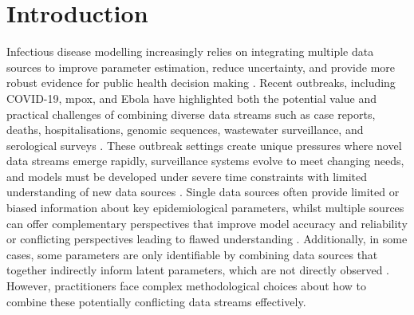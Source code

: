 \documentclass{article}
\begin{document}
\section{Introduction}

Infectious disease modelling increasingly relies on integrating multiple data sources to improve parameter estimation, reduce uncertainty, and provide more robust evidence for public health decision making \citep{deangelis2018analysing}.
Recent outbreaks, including COVID-19, mpox, and Ebola have highlighted both the potential value and practical challenges of combining diverse data streams such as case reports, deaths, hospitalisations, genomic sequences, wastewater surveillance, and serological surveys \citep{knock2021key, ro2025estimating, Abbott2021-delta, Abbott2022-prevalence, Ward2024-sp,birrell2025real}.
These outbreak settings create unique pressures where novel data streams emerge rapidly, surveillance systems evolve to meet changing needs, and models must be developed under severe time constraints with limited understanding of new data sources \citep{mccaw2023role}.
Single data sources often provide limited or biased information about key epidemiological parameters, whilst multiple sources can offer complementary perspectives that improve model accuracy and reliability or conflicting perspectives leading to flawed understanding \citep{lison2024generative, sherratt2021exploring}.
Additionally, in some cases, some parameters are only identifiable by combining data sources that together indirectly inform latent parameters, which are not directly observed \citep{deangelis2018analysing}.
However, practitioners face complex methodological choices about how to combine these potentially conflicting data streams effectively.
\end{document}
